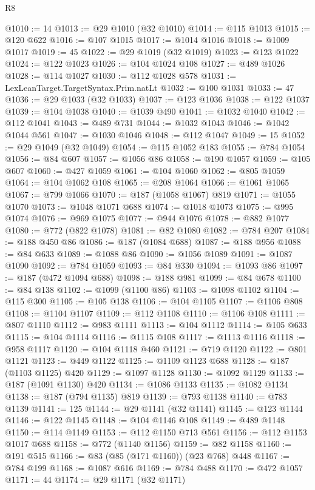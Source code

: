 \begin{lexlean}{R8}
\begin{coremodule}
@1010 := 14
@1013 := @29 @1010 (@32 @1010)
@1014 := @115 @1013
@1015 := @120 @622
@1016 := @107 @1015
@1017 := @1014 @1016
@1018 := @1009 @1017
@1019 := 45
@1022 := @29 @1019 (@32 @1019)
@1023 := @123 @1022
@1024 := @122 @1023
@1026 := @104 @1024 @108
@1027 := @489 @1026
@1028 := @114 @1027
@1030 := @112 @1028 @578
@1031 := LexLeanTarget.TargetSyntax.Prim.natLt
@1032 := @100 @1031
@1033 := 47
@1036 := @29 @1033 (@32 @1033)
@1037 := @123 @1036
@1038 := @122 @1037
@1039 := @104 @1038
@1040 := @1039 @490
@1041 := @1032 @1040
@1042 := @112 @1041
@1043 := @489 @731
@1044 := @1032 @1043
@1046 := @1042 @1044 @561
@1047 := @1030 @1046
@1048 := @112 @1047
@1049 := 15
@1052 := @29 @1049 (@32 @1049)
@1054 := @115 @1052 @183
@1055 := @784 @1054
@1056 := @84 @607
@1057 := @1056 @86
@1058 := @190 @1057
@1059 := @105 @607
@1060 := @427 @1059
@1061 := @104 @1060
@1062 := @805 @1059
@1064 := @104 @1062 @108
@1065 := @208 @1064
@1066 := @1061 @1065
@1067 := @799 @1066
@1070 := @187 (@1058 @1067) @819
@1071 := @1055 @1070
@1073 := @1048 @1071 @688
@1074 := @1018 @1073
@1075 := @995 @1074
@1076 := @969 @1075
@1077 := @944 @1076
@1078 := @882 @1077
@1080 := @772 (@822 @1078)
@1081 := @82 @1080
@1082 := @784 @207
@1084 := @188 @450 @86
@1086 := @187 (@1084 @688)
@1087 := @188 @956
@1088 := @84 @633
@1089 := @1088 @86
@1090 := @1056 @1089
@1091 := @1087 @1090
@1092 := @784 @1059
@1093 := @84 @330
@1094 := @1093 @86
@1097 := @187 (@472 @1094 @688)
@1098 := @188 @981
@1099 := @84 @678
@1100 := @84 @138
@1102 := @1099 (@1100 @86)
@1103 := @1098 @1102
@1104 := @115 @300
@1105 := @105 @138
@1106 := @104 @1105
@1107 := @1106 @808
@1108 := @1104 @1107
@1109 := @112 @1108
@1110 := @1106 @108
@1111 := @807 @1110
@1112 := @983 @1111
@1113 := @104 @1112
@1114 := @105 @633
@1115 := @104 @1114
@1116 := @1115 @108
@1117 := @1113 @1116
@1118 := @958 @1117
@1120 := @104 @1118 @460
@1121 := @719 @1120
@1122 := @801 @1121
@1123 := @449 @1122
@1125 := @1109 @1123 @688
@1128 := @187 (@1103 @1125) @420
@1129 := @1097 @1128
@1130 := @1092 @1129
@1133 := @187 (@1091 @1130) @420
@1134 := @1086 @1133
@1135 := @1082 @1134
@1138 := @187 (@794 @1135) @819
@1139 := @793 @1138
@1140 := @783 @1139
@1141 := 125
@1144 := @29 @1141 (@32 @1141)
@1145 := @123 @1144
@1146 := @122 @1145
@1148 := @104 @1146 @108
@1149 := @489 @1148
@1150 := @114 @1149
@1153 := @112 @1150 @713 @561
@1156 := @112 @1153 @1017 @688
@1158 := @772 (@1140 @1156)
@1159 := @82 @1158
@1160 := @191 @515
@1166 := @83 (@85 (@171 @1160)) (@23 @768) @448
@1167 := @784 @199
@1168 := @1087 @616
@1169 := @784 @488
@1170 := @472 @1057
@1171 := 44
@1174 := @29 @1171 (@32 @1171)

\end{coremodule}
\end{lexlean}
